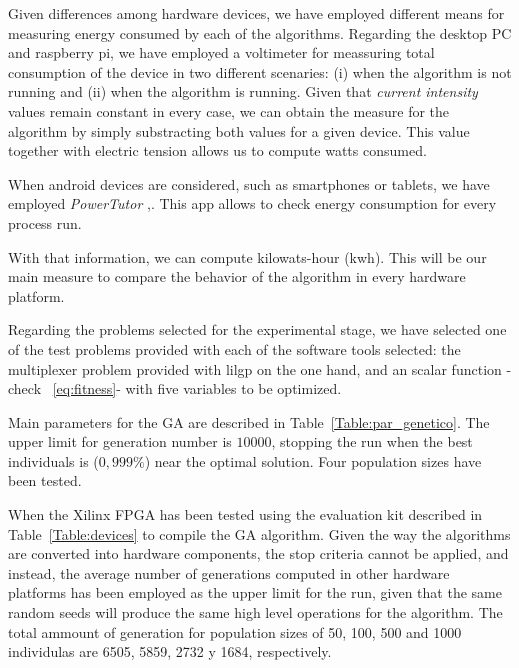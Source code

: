 Given differences among hardware devices, we have employed different means for measuring energy consumed by each of the algorithms.  Regarding the desktop PC and raspberry pi, we have employed a voltimeter for meassuring total consumption of the device in two different scenaries:  (i) when the algorithm is not running and (ii) when the algorithm is running.  Given that \textit{current intensity} values remain constant in every case, we can obtain the measure for the algorithm by simply substracting both values for a given device.  This value together with electric tension allows us to compute watts consumed.

When android devices are considered, such as smartphones or tablets, we have employed  \textit{PowerTutor} \cite{powertutor},\cite{powertutor2}. This app allows to check energy consumption for every process run.

With that information, we can compute kilowats-hour (kwh).  This will be our main measure to compare the behavior of the algorithm in every hardware platform.


Regarding the problems selected for the experimental stage, we have selected one of the test problems provided with each of the software tools selected:  the multiplexer problem provided with lilgp on the one hand, and an scalar function -check ~\ref{eq:fitness}-  with five variables to be optimized. 


Main parameters for the GA are described in Table~\ref{Table:par_genetico}.  The upper limit for generation number is  $10000$, stopping the run when the best individuals is ($0,999\%$) near the optimal solution. Four population sizes have been tested.

When the Xilinx FPGA has been tested using the evaluation kit described in Table~\ref{Table:devices} to compile the GA algorithm. Given the way the algorithms are converted into hardware components, the stop criteria cannot be applied, and instead, the average number of generations computed in other hardware platforms has been employed as the upper limit for the run, given that the same random seeds will produce the same high level operations for the algorithm.  The total ammount of generation for population sizes of 50, 100, 500 and 1000 individulas are  6505, 5859, 2732 y 1684, respectively.


